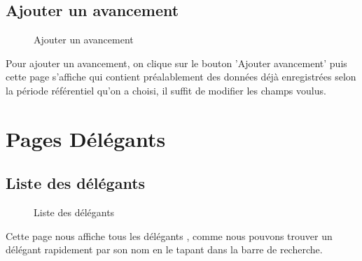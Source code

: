 \documentclass[a4paper]{report}
\begin{document}
\begin{doublespace}
\subsection{Ajouter un avancement}
\begin{figure}[H]
	\begin{center}
		\caption{Ajouter un avancement}
	\end{center}
\end{figure}
Pour ajouter un avancement, on clique sur le bouton 'Ajouter avancement' puis cette page s'affiche qui contient préalablement des données déjà enregistrées selon la période référentiel qu'on a choisi, il suffit de modifier les champs voulus.
\section{Pages Délégants}
\subsection{Liste des délégants}
\begin{figure}[H]
	\begin{center}
		\caption{Liste des délégants}
	\end{center}
\end{figure}
Cette page nous affiche tous les délégants , comme nous pouvons trouver un délégant rapidement par son nom en le tapant dans la barre de recherche.

\end{doublespace}
\end{document}
